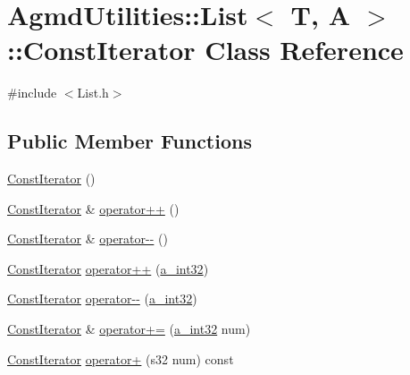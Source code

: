 \hypertarget{class_agmd_utilities_1_1_list_1_1_const_iterator}{\section{Agmd\+Utilities\+:\+:List$<$ T, A $>$\+:\+:Const\+Iterator Class Reference}
\label{class_agmd_utilities_1_1_list_1_1_const_iterator}
}


{\ttfamily \#include $<$List.\+h$>$}

\subsection*{Public Member Functions}
\begin{DoxyCompactItemize}
\item 
\hyperlink{class_agmd_utilities_1_1_list_1_1_const_iterator_a1f6e9c252e76f31d3dbd7db0ab055159}{Const\+Iterator} ()
\item 
\hyperlink{class_agmd_utilities_1_1_list_1_1_const_iterator}{Const\+Iterator} \& \hyperlink{class_agmd_utilities_1_1_list_1_1_const_iterator_af61d3c13b42777d872dda18d1f32c37e}{operator++} ()
\item 
\hyperlink{class_agmd_utilities_1_1_list_1_1_const_iterator}{Const\+Iterator} \& \hyperlink{class_agmd_utilities_1_1_list_1_1_const_iterator_aadcfb409553c0caeb0853f41e3f17ad7}{operator-\/-\/} ()
\item 
\hyperlink{class_agmd_utilities_1_1_list_1_1_const_iterator}{Const\+Iterator} \hyperlink{class_agmd_utilities_1_1_list_1_1_const_iterator_a9994b8c8ce2720fb227d368f8a830b19}{operator++} (\hyperlink{_common_defines_8h_ae2e4316e0b924774484a728669bebc9b}{a\+\_\+int32})
\item 
\hyperlink{class_agmd_utilities_1_1_list_1_1_const_iterator}{Const\+Iterator} \hyperlink{class_agmd_utilities_1_1_list_1_1_const_iterator_a368bd211299c859b8a24533b452f35c3}{operator-\/-\/} (\hyperlink{_common_defines_8h_ae2e4316e0b924774484a728669bebc9b}{a\+\_\+int32})
\item 
\hyperlink{class_agmd_utilities_1_1_list_1_1_const_iterator}{Const\+Iterator} \& \hyperlink{class_agmd_utilities_1_1_list_1_1_const_iterator_af41403c5b0cf2ad171bb607772101039}{operator+=} (\hyperlink{_common_defines_8h_ae2e4316e0b924774484a728669bebc9b}{a\+\_\+int32} num)
\item 
\hyperlink{class_agmd_utilities_1_1_list_1_1_const_iterator}{Const\+Iterator} \hyperlink{class_agmd_utilities_1_1_list_1_1_const_iterator_afd1129fddd1f18f9b7a6af4d00f11434}{operator+} (s32 num) const 

\end{DoxyCompactItemize}
